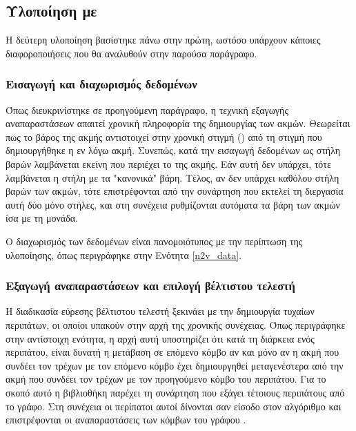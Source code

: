 \subsection{Υλοποίηση με }

Η δεύτερη υλοποίηση βασίστηκε πάνω στην πρώτη, ωστόσο υπάρχουν κάποιες διαφοροποιήσεις που θα
αναλυθούν στην παρούσα παράγραφο. 

\subsubsection{Εισαγωγή και διαχωρισμός δεδομένων}

Όπως διευκρινίστηκε σε προηγούμενη παράγραφο, η τεχνική εξαγωγής αναπαραστάσεων  
απαιτεί χρονική πληροφορία της δημιουργίας των ακμών. Θεωρείται πως το βάρος της ακμής 
αντιστοιχεί στην χρονική στιγμή () από τη στιγμή  που δημιουργήθηκε η
εν λόγω ακμή. Συνεπώς, κατά την εισαγωγή δεδομένων ως στήλη βαρών λαμβάνεται εκείνη που περιέχει
το  της ακμής. Εάν αυτή δεν υπάρχει, τότε λαμβάνεται η στήλη με τα "κανονικά"
βάρη. Τέλος, αν δεν υπάρχει καθόλου στήλη βαρών των ακμών, τότε επιστρέφονται από την συνάρτηση
που εκτελεί τη διεργασία αυτή δύο μόνο στήλες, και στη συνέχεια ρυθμίζονται αυτόματα τα βάρη των
ακμών ίσα με τη μονάδα.

Ο διαχωρισμός των δεδομένων είναι πανομοιότυπος με την περίπτωση της  υλοποίησης,
όπως περιγράφηκε στην Ενότητα \ref{n2v_data}.

\subsubsection{Εξαγωγή αναπαραστάσεων και επιλογή βέλτιστου τελεστή}

Η διαδικασία εύρεσης βέλτιστου τελεστή ξεκινάει με την δημιουργία τυχαίων περιπάτων, οι οποίοι
υπακούν στην αρχή της χρονικής συνέχειας. Όπως περιγράφηκε στην αντίστοιχη ενότητα, η αρχή
αυτή υποστηρίζει ότι κατά τη διάρκεια ενός περιπάτου, είναι δυνατή η μετάβαση σε επόμενο κόμβο
αν και μόνο αν η ακμή που συνδέει τον τρέχων με τον επόμενο κόμβο έχει δημιουργηθεί μεταγενέστερα
από την ακμή που συνδέει τον τρέχων με τον προηγούμενο κόμβο του περιπάτου. Για το σκοπό αυτό
η βιβλιοθήκη  \cite{StellarGraph} παρέχει τη συνάρτηση 
 που εξάγει τέτοιους περιπάτους από το γράφο. 
Στη συνέχεια οι περίπατοι αυτοί δίνονται σαν είσοδο στον αλγόριθμο  και 
επιστρέφονται οι αναπαραστάσεις των κόμβων του γράφου .

